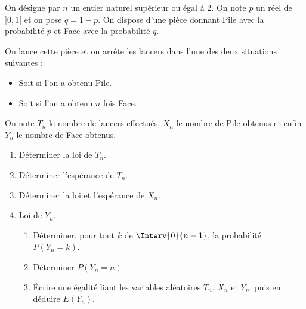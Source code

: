 \documentclass[a4paper,10pt]{report}
\begin{document}
\begin{Exa} On désigne par $n$ un entier naturel supérieur ou égal à 2. On note $p$ un réel de $]0,1[$ et on pose $q = 1-p$. On dispose d'une pièce donnant Pile avec la probabilité $p$ et Face avec la probabilité $q$.

\noindent On lance cette pièce et on arrête les lancers dans l'une des deux situations suivantes :
\begin{itemize}
 \item Soit si l'on a obtenu Pile.
 \item Soit si l'on a obtenu $n$ fois Face.
\end{itemize}
%

\noindent On note $T_n$ le nombre de lancers effectués, $X_n$ le nombre de Pile obtenus et enfin $Y_n$ le nombre de Face obtenus. 
\begin{enumerate}
 \item  Déterminer la loi de $T_n$.
 \item  Déterminer l'espérance de $T_n$.
 \item Déterminer la loi et l'espérance de $X_n$.
 \item Loi de $Y_n$.
 \begin{enumerate}
  \item Déterminer, pour tout $k$ de $\Interv{0}{n-1}$, la probabilité $P(Y_n = k)$.
  \item Déterminer $P(Y_n = n)$.
  \item Écrire une égalité liant les variables aléatoires $T_n$, $X_n$ et $Y_n$, puis en déduire $E(Y_n)$.
\end{enumerate}
\end{enumerate}
\end{Exa}
\end{document}

